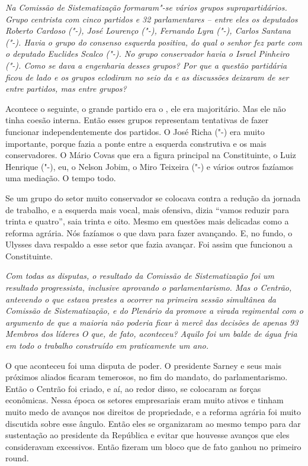 \medskip

\emph{Na Comissão de Sistematização formaram"-se vários grupos
suprapartidários. Grupo centrista com cinco partidos e 32 parlamentares
-- entre eles os deputados Roberto Cardoso ("-), José
Lourenço ("-), Fernando Lyra ("-), Carlos Santana ("-).
Havia o grupo do consenso esquerda positiva, do qual o senhor fez parte
com o deputado Euclides Scalco ("-). No grupo conservador havia o
Israel Pinheiro ("-). Como se dava a engenharia desses grupos? Por
que a questão partidária ficou de lado e os grupos eclodiram no seio da
 e as discussões deixaram de ser entre partidos, mas entre grupos?}

Acontece o seguinte, o grande partido era o , ele era
majoritário. Mas ele não tinha coesão interna. Então esses grupos
representam tentativas de fazer funcionar independentemente dos
partidos. O José Richa ("-) era muito importante, porque fazia a
ponte entre a esquerda construtiva e os mais conservadores. O Mário
Covas que era a figura principal na Constituinte, o Luiz Henrique
("-), eu, o Nelson Jobim, o Miro Teixeira ("-) e vários outros
fazíamos uma mediação. O tempo todo.

Se um grupo do setor muito conservador se colocava contra a redução da
jornada de trabalho, e a esquerda mais vocal, mais ofensiva, dizia
``vamos reduzir para trinta e quatro'', saia trinta e oito. Mesmo em
questões mais delicadas como a reforma agrária. Nós fazíamos o que dava
para fazer avançando. E, no fundo, o Ulysses dava respaldo a esse setor
que fazia avançar. Foi assim que funcionou a Constituinte.

\medskip

\emph{Com todas as disputas, o resultado da Comissão de Sistematização
foi um resultado progressista, inclusive aprovando o parlamentarismo.
Mas o Centrão, antevendo o que estava prestes a ocorrer na primeira
sessão simultânea da Comissão de Sistematização, e do Plenário da 
promove a virada regimental com o argumento de que a maioria não poderia
ficar à mercê das decisões de apenas 93 Membros dos líderes O que, de
fato, aconteceu? Aquilo foi um balde de água fria em todo o trabalho
construído em praticamente um ano.}

O que aconteceu foi uma disputa de poder. O presidente
Sarney e seus mais próximos aliados ficaram temerosos, no fim do
mandato, do parlamentarismo. Então o Centrão foi criado, e aí, ao redor
disso, se colocaram as forças econômicas. Nessa época os setores
empresariais eram muito ativos e tinham muito medo de avanços nos
direitos de propriedade, e a reforma agrária foi muito discutida sobre
esse ângulo. Então eles se organizaram ao mesmo tempo para dar
sustentação ao presidente da República e evitar que houvesse avanços que
eles consideravam excessivos. Então fizeram um bloco que de fato ganhou
no primeiro round.

